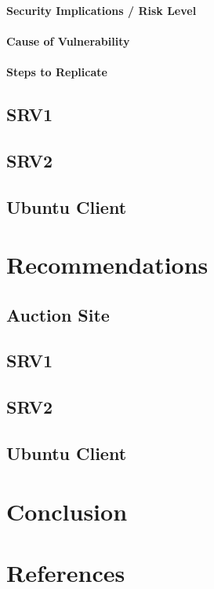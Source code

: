 \documentclass{report}
\begin{document}
\subsubsection{Security Implications / Risk Level}
\subsubsection{Cause of Vulnerability}
\subsubsection{Steps to Replicate}
\section{SRV1}
\section{SRV2}
\section{Ubuntu Client}

\chapter{Recommendations}
\section{Auction Site}
\section{SRV1}
\section{SRV2}
\section{Ubuntu Client}

\chapter{Conclusion}

\chapter{References}
\end{document}
